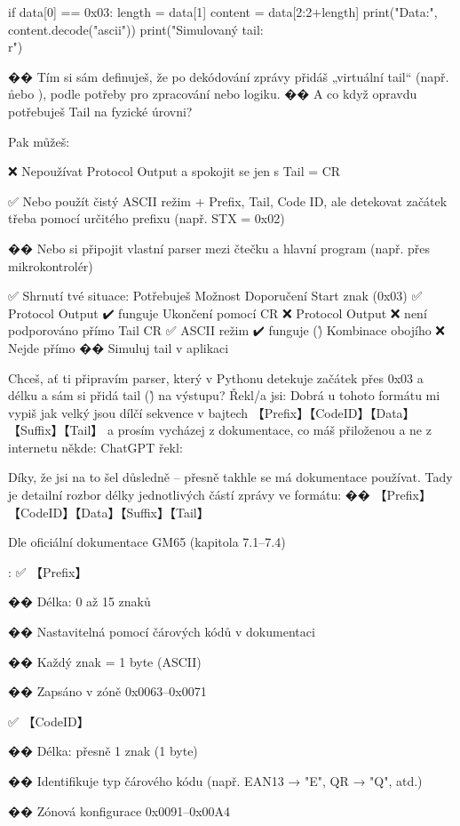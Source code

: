 if data[0] == 0x03:
    length = data[1]
    content = data[2:2+length]
    print("Data:", content.decode("ascii"))
    print("Simulovaný tail: \\r")

�� Tím si sám definuješ, že po dekódování zprávy přidáš „virtuální tail“ (např. \r nebo \n), podle potřeby pro zpracování nebo logiku.
�� A co když opravdu potřebuješ Tail na fyzické úrovni?

Pak můžeš:

    ❌ Nepoužívat Protocol Output a spokojit se jen s Tail = CR

    ✅ Nebo použít čistý ASCII režim + Prefix, Tail, Code ID, ale detekovat začátek třeba pomocí určitého prefixu (např. STX = 0x02)

    �� Nebo si připojit vlastní parser mezi čtečku a hlavní program (např. přes mikrokontrolér)

✅ Shrnutí tvé situace:
Potřebuješ	Možnost	Doporučení
Start znak (0x03)	✅ Protocol Output	✔️ funguje
Ukončení pomocí CR	❌ Protocol Output	❌ není podporováno přímo
Tail CR	✅ ASCII režim	✔️ funguje (\r)
Kombinace obojího	❌ Nejde přímo	�� Simuluj tail v aplikaci

Chceš, ať ti připravím parser, který v Pythonu detekuje začátek přes 0x03 a délku a sám si přidá tail (\r) na výstupu?
Řekl/a jsi:
Dobrá u tohoto formátu mi vypiš jak velký jsou dílčí sekvence v bajtech 【Prefix】【CodeID】【Data】【Suffix】【Tail】 a prosím vycházej z dokumentace, co máš přiloženou a ne z internetu někde:
ChatGPT řekl:

Díky, že jsi na to šel důsledně – přesně takhle se má dokumentace používat. Tady je detailní rozbor délky jednotlivých částí zprávy ve formátu:
�� 【Prefix】【CodeID】【Data】【Suffix】【Tail】

Dle oficiální dokumentace GM65 (kapitola 7.1–7.4)​
​

:
✅ 【Prefix】

    �� Délka: 0 až 15 znaků

    �� Nastavitelná pomocí čárových kódů v dokumentaci

    �� Každý znak = 1 byte (ASCII)

    �� Zapsáno v zóně 0x0063–0x0071

✅ 【CodeID】

    �� Délka: přesně 1 znak (1 byte)

    �� Identifikuje typ čárového kódu (např. EAN13 → "E", QR → "Q", atd.)

    �� Zónová konfigurace 0x0091–0x00A4

